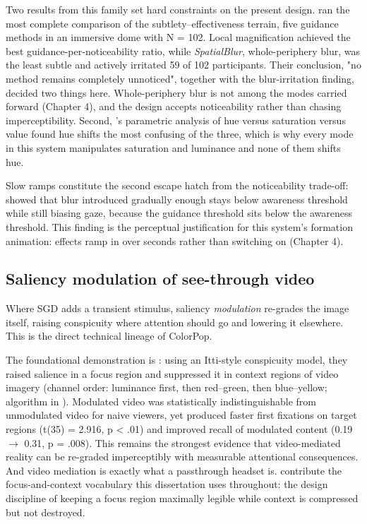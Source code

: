 Two results from this family set hard constraints on the present design. \citet{grogorick2018} ran the most complete comparison of the subtlety–effectiveness terrain, five guidance
methods in an immersive dome with N = 102. Local magnification achieved the best
guidance-per-noticeability ratio, while \textit{SpatialBlur}, whole-periphery blur, was the least subtle
and actively irritated 59 of 102 participants. Their conclusion, "no method remains completely
unnoticed", together with the blur-irritation finding, decided two things here. Whole-periphery blur
is not among the modes carried forward (Chapter 4), and the design accepts noticeability rather than
chasing imperceptibility. Second, \citet{erickson2023}'s parametric analysis of hue
versus saturation versus value found hue shifts the most confusing of the three, which is why every
mode in this system manipulates saturation and luminance and none of them shifts hue.

Slow ramps constitute the second escape hatch from the noticeability trade-off: \citet{hata2016} showed that blur introduced gradually enough stays below awareness threshold while still
biasing gaze, because the guidance threshold sits below the awareness threshold. This finding is the
perceptual justification for this system's formation animation: effects ramp in over seconds rather
than switching on (Chapter 4).

\subsection{Saliency modulation of see-through video}

Where SGD adds a transient stimulus, saliency \textit{modulation} re-grades the image itself, raising
conspicuity where attention should go and lowering it elsewhere. This is the direct technical
lineage of ColorPop.

The foundational demonstration is \citet{veas2011}: using an Itti-style
conspicuity model, they raised salience in a focus region and suppressed it in context regions of
video imagery (channel order: luminance first, then red–green, then blue–yellow; algorithm in \citealp{mendez2010}). Modulated video was statistically indistinguishable from unmodulated
video for naive viewers, yet produced faster first fixations on target regions (t(35) = 2.916,
p < .01) and improved recall of modulated content (0.19 $\rightarrow$ 0.31, p = .008). This remains the strongest
evidence that video-mediated reality can be re-graded imperceptibly with measurable attentional
consequences. And video mediation is exactly what a passthrough headset is. \citet{kalkofen2007} contribute the focus-and-context vocabulary this dissertation uses throughout:
the design discipline of keeping a focus region maximally legible while context is compressed but
not destroyed.

